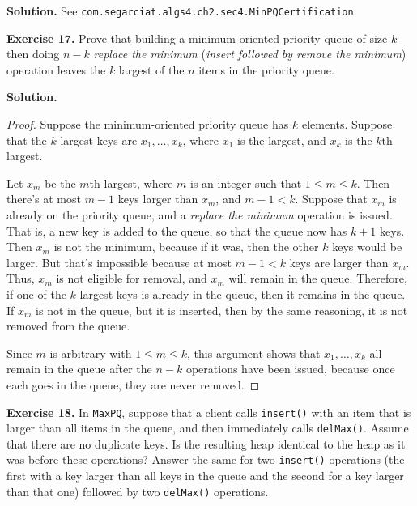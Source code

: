 \documentclass[12pt, a4paper]{article}
\newenvironment{ex}[2][Exercise]
{\par\medskip\noindent \textbf{#1 #2.}}
{\medskip}
\newenvironment{sol}[1][Solution]
{\par\medskip\noindent \textbf{#1.} }
{\medskip}
\begin{document}
	\begin{sol}
		See \texttt{com.segarciat.algs4.ch2.sec4.MinPQCertification}.
	\end{sol}
	\begin{ex}{17}
		Prove that building a minimum-oriented priority queue of size $k$ then doing
		$n-k$ \emph{replace the minimum} (\emph{insert followed by remove the minimum})
		operation leaves the $k$ largest of the $n$ items in the priority queue.
	\end{ex}
	\begin{sol}
		\begin{proof}
			Suppose the minimum-oriented priority queue has $k$ elements. Suppose
			that the $k$ largest keys are $x_1,\ldots,x_k$, where $x_1$ is the
			largest, and $x_k$ is the $k$th largest.
			
			Let $x_m$ be the $m$th largest, where $m$ is an integer such that $1\leq m\leq k$.
			Then there's at most $m-1$ keys larger than $x_m$, and $m-1<k$. Suppose
			that $x_m$ is already on the priority queue, and a \emph{replace the minimum}
			operation is issued. That is, a new key is added to the queue, so
			that the queue now has $k+1$ keys. Then $x_m$ is not the minimum,
			because if it was, then the other $k$ keys would be larger. But that's
			impossible because at most $m-1<k$ keys are larger than $x_m$. Thus,
			$x_m$ is not eligible for removal, and $x_m$ will remain in the queue.
			Therefore, if one of the $k$ largest keys is already in the queue,
			then it remains in the queue. If $x_m$ is not in the queue, but it is
			inserted, then by the same reasoning, it is not removed from the queue.
			
			Since $m$ is arbitrary with $1\leq m\leq k$, this argument shows that
			$x_1,\ldots,x_k$ all remain in the queue after the $n-k$ operations have
			been issued, because once each goes in the queue, they are never removed.
		\end{proof}
	\end{sol}
	\begin{ex}{18}
		In \texttt{MaxPQ}, suppose that a client calls \texttt{insert()} with an item
		that is larger than all items in the queue, and then immediately calls
		\texttt{delMax()}. Assume that there are no duplicate keys. Is the resulting
		heap identical to the heap as it was before these operations? Answer the
		same for two \texttt{insert()} operations (the first with a key larger
		than all keys in the queue and the second for a key larger than that one)
		followed by two \texttt{delMax()} operations.
	\end{ex}
\end{document}
